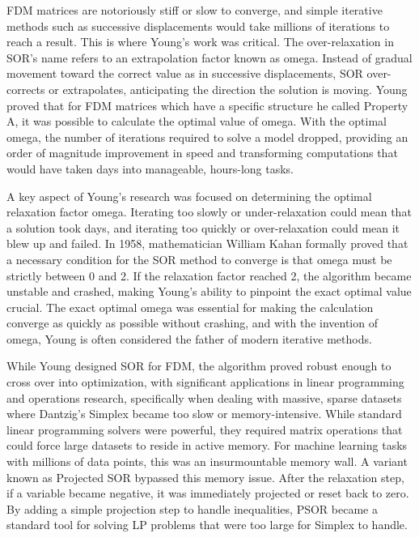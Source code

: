 FDM matrices are notoriously stiff or slow to converge, and simple iterative methods such as successive displacements would take millions of iterations to reach a result. This is where Young's work was critical. The over-relaxation in SOR’s name refers to an extrapolation factor known as omega. Instead of gradual movement toward the correct value as in successive displacements, SOR over-corrects or extrapolates, anticipating the direction the solution is moving. Young proved that for FDM matrices which have a specific structure he called Property A, it was possible to calculate the optimal value of omega. With the optimal omega, the number of iterations required to solve a model dropped, providing an order of magnitude improvement in speed and transforming computations that would have taken days into manageable, hours-long tasks.

A key aspect of Young’s research was focused on determining the optimal relaxation factor omega. Iterating too slowly or under-relaxation could mean that a solution took days, and iterating too quickly or over-relaxation could mean it blew up and failed. In 1958, mathematician William Kahan formally proved that a necessary condition for the SOR method to converge is that omega must be strictly between 0 and 2. If the relaxation factor reached 2, the algorithm became unstable and crashed, making Young's ability to pinpoint the exact optimal value crucial. The exact optimal omega was essential for making the calculation converge as quickly as possible without crashing, and with the invention of omega, Young is often considered the father of modern iterative methods. 

While Young designed SOR for FDM, the algorithm proved robust enough to cross over into optimization, with significant applications in linear programming and operations research, specifically when dealing with massive, sparse datasets where Dantzig’s Simplex became too slow or memory-intensive. While standard linear programming solvers were powerful, they required matrix operations that could force large datasets to reside in active memory. For machine learning tasks with millions of data points, this was an insurmountable memory wall. A variant known as Projected SOR bypassed this memory issue. After the relaxation step, if a variable became negative, it was immediately projected or reset back to zero. By adding a simple projection step to handle inequalities, PSOR became a standard tool for solving LP problems that were too large for Simplex to handle. 

